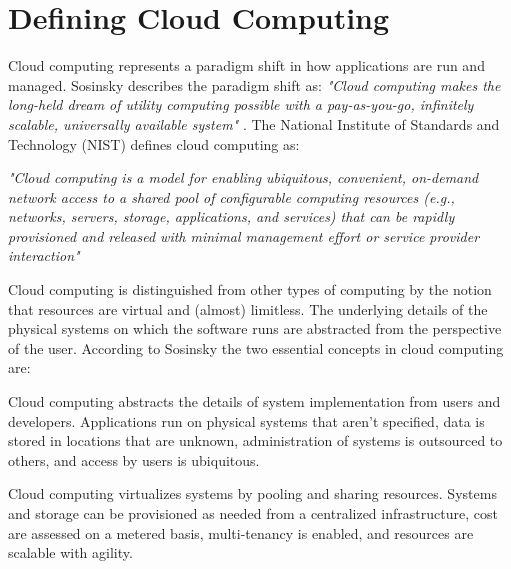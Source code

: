 \section{Defining Cloud Computing}
Cloud computing represents a paradigm shift in how applications are run and managed. Sosinsky describes the paradigm shift as: \textit{"Cloud computing makes the long-held dream of utility computing possible with a pay-as-you-go, infinitely scalable, universally available system"} \cite[p. 3]{sosinsky2011cloud}. The National Institute of Standards and Technology (NIST) defines cloud computing as: 

\begin{definition}[Definition]
    \textit{"Cloud computing is a model for enabling ubiquitous, convenient, on-demand network access to a shared pool of configurable computing resources (e.g., networks, servers, storage, applications, and services) that can be rapidly provisioned and released with minimal management effort or service provider interaction"} \cite[p. 2]{nist2011definition}
\end{definition}

\noindent 
Cloud computing is distinguished from other types of computing by the notion that resources are virtual and (almost) limitless. The underlying details of the physical systems on which the software runs are abstracted from the perspective of the user. According to Sosinsky the two essential concepts in cloud computing are:

\begin{definition} [Abstraction]
Cloud computing abstracts the details of system implementation from users and developers. Applications run on physical systems that aren't specified, data is stored in locations that are unknown, administration of systems is outsourced to others, and access by users is ubiquitous. \cite[p. 4]{sosinsky2011cloud}    
\end{definition}

\begin{definition} [Virtualization]
Cloud computing virtualizes systems by pooling and sharing resources. Systems and storage can be provisioned as needed from a centralized infrastructure, cost are assessed on a metered basis, multi-tenancy is enabled, and resources are scalable with agility. \cite[p. 4]{sosinsky2011cloud}    
\end{definition}

